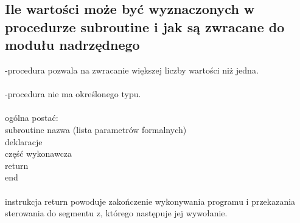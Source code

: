 \subsection{Ile wartości może być wyznaczonych w procedurze subroutine i jak są zwracane do modułu nadrzędnego}
-procedura pozwala na zwracanie większej liczby wartości niż jedna.
\\
\\
-procedura nie ma określonego typu.
\\
\\
ogólna postać:
\\
subroutine nazwa (lista parametrów formalnych)
\\
deklaracje
\\
część wykonawcza
\\
return
\\
end
\\
\\
instrukcja return powoduje zakończenie wykonywania programu i przekazania sterowania do segmentu z, którego następuje jej wywołanie.